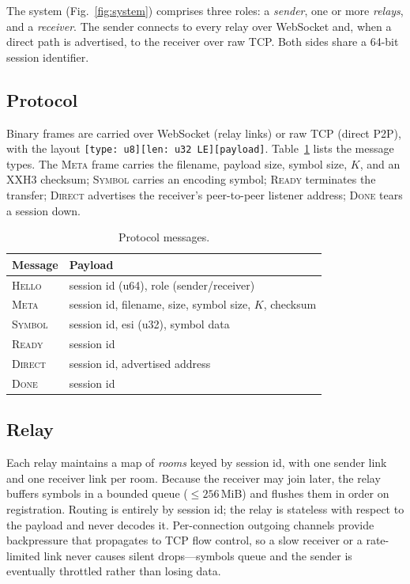 \documentclass[conference]{IEEEtran}
\begin{document}
The system (Fig.~\ref{fig:system}) comprises three roles: a \emph{sender}, one
or more \emph{relays}, and a \emph{receiver}. The sender connects to every
relay over WebSocket and, when a direct path is advertised, to the receiver
over raw TCP. Both sides share a 64-bit session identifier.

\subsection{Protocol}
Binary frames are carried over WebSocket (relay links) or raw TCP (direct
P2P), with the layout
\texttt{[type: u8][len: u32 LE][payload]}. Table~\ref{tab:protocol} lists the
message types. The \textsc{Meta} frame carries the filename, payload size,
symbol size, $K$, and an XXH3 checksum; \textsc{Symbol} carries an encoding
symbol; \textsc{Ready} terminates the transfer; \textsc{Direct} advertises the
receiver's peer-to-peer listener address; \textsc{Done} tears a session down.

\begin{table}[!t]
\centering
\caption{Protocol messages.}
\label{tab:protocol}
\begin{tabular}{@{}lp{}@{}}
\toprule
Message & Payload \\
\midrule
\textsc{Hello} & session id (u64), role (sender/receiver) \\
\textsc{Meta} & session id, filename, size, symbol size, $K$, checksum \\
\textsc{Symbol} & session id, esi (u32), symbol data \\
\textsc{Ready} & session id \\
\textsc{Direct} & session id, advertised address \\
\textsc{Done} & session id \\
\bottomrule
\end{tabular}
\end{table}

\subsection{Relay}
Each relay maintains a map of \emph{rooms} keyed by session id, with one
sender link and one receiver link per room. Because the receiver may join
later, the relay buffers symbols in a bounded queue ($\le 256$\,MiB) and flushes
them in order on registration. Routing is entirely by session id; the relay is
stateless with respect to the payload and never decodes it. Per-connection
outgoing channels provide backpressure that propagates to TCP flow control, so
a slow receiver or a rate-limited link never causes silent drops---symbols
queue and the sender is eventually throttled rather than losing data.
\end{document}
